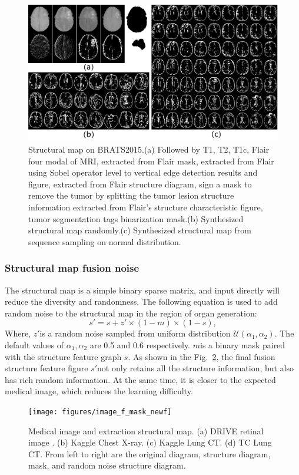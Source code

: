 \documentclass[runningheads]{llncs}
\begin{document}
\begin{figure}[thbp!]
	\centering
	\includegraphics[width=1\linewidth]{figures/brats_f}
	\caption{Structural map on BRATS2015.(a) Followed by T1, T2, T1c, Flair four modal of MRI, extracted from Flair mask, extracted from Flair using Sobel operator level to vertical edge detection results and figure, extracted from Flair structure diagram, sign a mask to remove the tumor by splitting the tumor lesion structure information extracted from Flair's structure characteristic figure, tumor segmentation tags binarization mask.(b) Synthesized structural map randomly.(c) Synthesized structural map from sequence sampling on normal distribution.}
	\label{generated_f}
\end{figure}

\subsubsection{Structural map fusion noise}
The structural map is a simple binary sparse matrix, and input directly will reduce the diversity and randomness. The following equation is used to add random noise to the structural map in the region of organ generation:
\begin{equation}
s'=s+z'\times(1-m)\times(1-s),
\end{equation}
Where, $z'$is a random noise sampled from uniform distribution $\mathcal{U}(\alpha_1,\alpha_2)$. The default values of $\alpha_1,\alpha_2$ are 0.5 and 0.6 respectively. $m$is a binary mask paired with the structure feature graph $s$. As shown in the Fig.~\ref{image_and_f}, the final fusion structure feature figure $s'$not only retains all the structure information, but also has rich random information. At the same time, it is closer to the expected medical image, which reduces the learning difficulty.
\begin{figure}[thbp!]
	\centering
	\texttt{[image: figures/image\_f\_mask\_newf]}
	\caption{Medical image and extraction structural map. (a) DRIVE retinal image . (b) Kaggle Chest X-ray. (c) Kaggle Lung CT. (d) TC Lung CT. From left to right are the original diagram, structure diagram, mask, and random noise structure diagram.}
	\label{image_and_f}
\end{figure}
\end{document}
